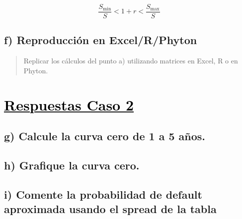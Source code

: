 \documentclass[12pt]{article}
\newcommand{\subrayadoRojo}[1]{{\color{rojoudp}\underline{\textcolor{black}{#1}}}}
\begin{document}
\[
\frac{S_{\min}}{S} < 1 + r < \frac{S_{\max}}{S}
\]

\subsection*{f) Reproducción en Excel/R/Phyton}

\begin{quote}
Replicar los cálculos del punto a) utilizando matrices en Excel, R o en Phyton.
\end{quote}
\newpage
\section*{\subrayadoRojo{Respuestas Caso 2}}

\subsection*{g) Calcule la curva cero de 1 a 5 años.}

\subsection*{h) Grafique la curva cero.}

\subsection*{i) 
Comente la probabilidad de default aproximada usando el spread de la tabla}
\end{document}
